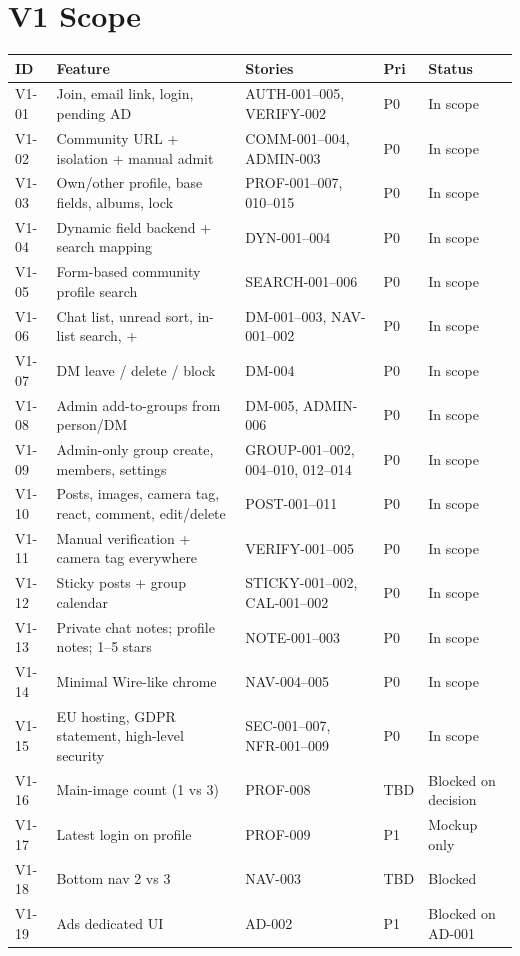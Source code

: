 \documentclass[11pt,a4paper]{article}
\begin{document}
\section{V1 Scope}

\begin{longtable}{@{}p{2.1cm}p{4.6cm}p{3.6cm}p{1.6cm}p{2.2cm}@{}}
\toprule
\textbf{ID} & \textbf{Feature} & \textbf{Stories} & \textbf{Pri} & \textbf{Status} \\
\midrule
\endhead
V1-01 & Join, email link, login, pending AD & AUTH-001--005, VERIFY-002 & P0 & In scope \\
V1-02 & Community URL + isolation + manual admit & COMM-001--004, ADMIN-003 & P0 & In scope \\
V1-03 & Own/other profile, base fields, albums, lock & PROF-001--007, 010--015 & P0 & In scope \\
V1-04 & Dynamic field backend + search mapping & DYN-001--004 & P0 & In scope \\
V1-05 & Form-based community profile search & SEARCH-001--006 & P0 & In scope \\
V1-06 & Chat list, unread sort, in-list search, + & DM-001--003, NAV-001--002 & P0 & In scope \\
V1-07 & DM leave / delete / block & DM-004 & P0 & In scope \\
V1-08 & Admin add-to-groups from person/DM & DM-005, ADMIN-006 & P0 & In scope \\
V1-09 & Admin-only group create, members, settings & GROUP-001--002, 004--010, 012--014 & P0 & In scope \\
V1-10 & Posts, images, camera tag, react, comment, edit/delete & POST-001--011 & P0 & In scope \\
V1-11 & Manual verification + camera tag everywhere & VERIFY-001--005 & P0 & In scope \\
V1-12 & Sticky posts + group calendar & STICKY-001--002, CAL-001--002 & P0 & In scope \\
V1-13 & Private chat notes; profile notes; 1--5 stars & NOTE-001--003 & P0 & In scope \\
V1-14 & Minimal Wire-like chrome & NAV-004--005 & P0 & In scope \\
V1-15 & EU hosting, GDPR statement, high-level security & SEC-001--007, NFR-001--009 & P0 & In scope \\
V1-16 & Main-image count (1 vs 3) & PROF-008 & TBD & Blocked on decision \\
V1-17 & Latest login on profile & PROF-009 & P1 & Mockup only \\
V1-18 & Bottom nav 2 vs 3 & NAV-003 & TBD & Blocked \\
V1-19 & Ads dedicated UI & AD-002 & P1 & Blocked on AD-001 \\
\bottomrule
\end{longtable}
\end{document}
